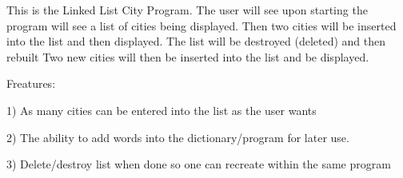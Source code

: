 This is the Linked List City Program. The user will see upon starting the program will see a list of cities being displayed. Then two cities will be inserted into the list and then displayed. The list will be destroyed (deleted) and then rebuilt Two new cities will then be inserted into the list and be displayed.

Freatures\+:

1) As many cities can be entered into the list as the user wants

2) The ability to add words into the dictionary/program for later use.

3) Delete/destroy list when done so one can recreate within the same program 